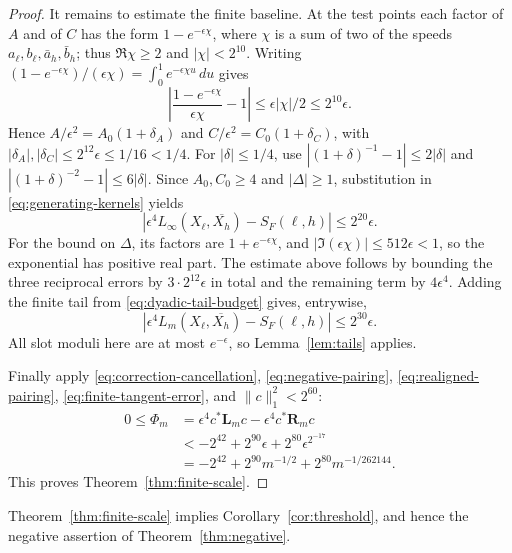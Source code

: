 \begin{proof}
It remains to estimate the finite baseline. At the test points each
factor of $A$ and of $C$ has the form $1-e^{-\epsilon\chi}$, where
$\chi$ is a sum of two of the speeds $a_\ell,b_\ell,\bar a_h,\bar b_h$;
thus $\Re\chi\ge2$ and $|\chi|<2^{10}$. Writing
$(1-e^{-\epsilon\chi})/(\epsilon\chi)=\int_0^1e^{-\epsilon\chi u}\,du$
gives
\[
 \left|\frac{1-e^{-\epsilon \chi}}{\epsilon \chi}-1\right|
 \le\epsilon|\chi|/2\le2^{10}\epsilon.
\]
Hence \(A/\epsilon^2=A_0(1+\delta_A)\) and
\(C/\epsilon^2=C_0(1+\delta_C)\), with
\(|\delta_A|,|\delta_C|\le2^{12}\epsilon\le1/16<1/4\).
For \(|\delta|\le1/4\), use
\(|(1+\delta)^{-1}-1|\le2|\delta|\) and
\(|(1+\delta)^{-2}-1|\le6|\delta|\).
Since \(A_0,C_0\ge4\) and \(|\Delta{}|\ge1\), substitution in \eqref{eq:generating-kernels} yields
\[
 |\epsilon^4L_\infty(X_\ell,\overline{X_h})-S_F(\ell,h)|
                                               \le2^{20}\epsilon.
\]
For the bound on \(\Delta{}\), its factors are \(1+e^{-\epsilon \chi}\), and
\(|\Im(\epsilon \chi)|\le512\epsilon<1\), so the exponential has positive
real part. The estimate above follows by bounding the three reciprocal
errors by \(3\cdot2^{12}\epsilon\) in total and the remaining term by
\(4\epsilon^4\). Adding the finite tail from \eqref{eq:dyadic-tail-budget} gives, entrywise,
\begin{equation}
 |\epsilon^4L_m(X_\ell,\overline{X_h})-S_F(\ell,h)|
                                               \le2^{30}\epsilon.       \label{eq:finite-tangent-error}
\end{equation}
All slot moduli here are at most \(e^{-\epsilon}\), so Lemma~\ref{lem:tails} applies.

Finally apply \eqref{eq:correction-cancellation}, \eqref{eq:negative-pairing}, \eqref{eq:realigned-pairing}, \eqref{eq:finite-tangent-error}, and \(\|c\|_1^2<2^{60}\):
\begin{equation}
\begin{aligned}
 0\le\Phi_m
 &=\epsilon^4c^*\mathbf L_m c-\epsilon^4c^*\mathbf R_m c\\
 &<-2^{42}+2^{90}\epsilon+2^{80}\epsilon^{2^{-17}}\\
 &=-2^{42}+2^{90}m^{-1/2}+2^{80}m^{-1/262144}.
\end{aligned}                                                    \label{eq:finite-pairing-bound}
\end{equation}
This proves Theorem~\ref{thm:finite-scale}.
\end{proof}
Theorem~\ref{thm:finite-scale} implies Corollary~\ref{cor:threshold},
and hence the negative assertion of Theorem~\ref{thm:negative}.
